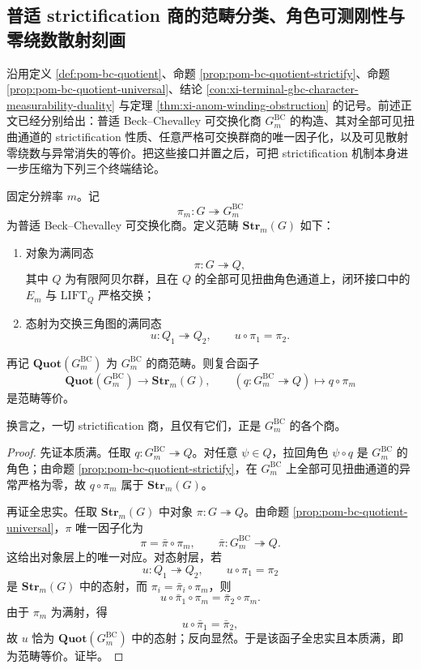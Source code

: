 \subsection{普适 strictification 商的范畴分类、角色可测刚性与零绕数散射刻画}\label{subsec:conclusion-strictification-character-scattering-rigidity}
沿用定义 \ref{def:pom-bc-quotient}、命题 \ref{prop:pom-bc-quotient-strictify}、命题 \ref{prop:pom-bc-quotient-universal}、结论 \ref{con:xi-terminal-gbc-character-measurability-duality} 与定理 \ref{thm:xi-anom-winding-obstruction} 的记号。前述正文已经分别给出：普适 Beck--Chevalley 可交换化商 \(G_m^{\mathrm{BC}}\) 的构造、其对全部可见扭曲通道的 strictification 性质、任意严格可交换群商的唯一因子化，以及可见散射零绕数与异常消失的等价。把这些接口并置之后，可把 strictification 机制本身进一步压缩为下列三个终端结论。

\begin{theorem}\label{thm:conclusion-strictification-quotients-category-equivalence}
固定分辨率 \(m\)。记
\[
\pi_m:G\twoheadrightarrow G_m^{\mathrm{BC}}
\]
为普适 Beck--Chevalley 可交换化商。定义范畴 \(\mathbf{Str}_m(G)\) 如下：
\begin{enumerate}
  \item 对象为满同态
  \[
  \pi:G\twoheadrightarrow Q,
  \]
  其中 \(Q\) 为有限阿贝尔群，且在 \(Q\) 的全部可见扭曲角色通道上，闭环接口中的 \(E_m\) 与 \(\mathrm{LIFT}_Q\) 严格交换；
  \item 态射为交换三角图的满同态
  \[
  u:Q_1\twoheadrightarrow Q_2,
  \qquad
  u\circ \pi_1=\pi_2.
  \]
\end{enumerate}
再记 \(\mathbf{Quot}(G_m^{\mathrm{BC}})\) 为 \(G_m^{\mathrm{BC}}\) 的商范畴。则复合函子
\[
\mathbf{Quot}(G_m^{\mathrm{BC}})
\longrightarrow
\mathbf{Str}_m(G),
\qquad
(q:G_m^{\mathrm{BC}}\twoheadrightarrow Q)\longmapsto q\circ\pi_m
\]
是范畴等价。

换言之，一切 strictification 商，且仅有它们，正是 \(G_m^{\mathrm{BC}}\) 的各个商。
\end{theorem}
\begin{proof}
先证本质满。任取 \(q:G_m^{\mathrm{BC}}\twoheadrightarrow Q\)。对任意 \(\psi\in \widehat Q\)，拉回角色 \(\psi\circ q\) 是 \(G_m^{\mathrm{BC}}\) 的角色；由命题 \ref{prop:pom-bc-quotient-strictify}，在 \(G_m^{\mathrm{BC}}\) 上全部可见扭曲通道的异常严格为零，故 \(q\circ\pi_m\) 属于 \(\mathbf{Str}_m(G)\)。

再证全忠实。任取 \(\mathbf{Str}_m(G)\) 中对象 \(\pi:G\twoheadrightarrow Q\)。由命题 \ref{prop:pom-bc-quotient-universal}，\(\pi\) 唯一因子化为
\[
\pi=\bar\pi\circ\pi_m,
\qquad
\bar\pi:G_m^{\mathrm{BC}}\twoheadrightarrow Q.
\]
这给出对象层上的唯一对应。对态射层，若
\[
u:Q_1\twoheadrightarrow Q_2,
\qquad
u\circ\pi_1=\pi_2
\]
是 \(\mathbf{Str}_m(G)\) 中的态射，而 \(\pi_i=\bar\pi_i\circ\pi_m\)，则
\[
u\circ\bar\pi_1\circ\pi_m=\bar\pi_2\circ\pi_m.
\]
由于 \(\pi_m\) 为满射，得
\[
u\circ\bar\pi_1=\bar\pi_2,
 \]
故 \(u\) 恰为 \(\mathbf{Quot}(G_m^{\mathrm{BC}})\) 中的态射；反向显然。于是该函子全忠实且本质满，即为范畴等价。证毕。
\end{proof}

